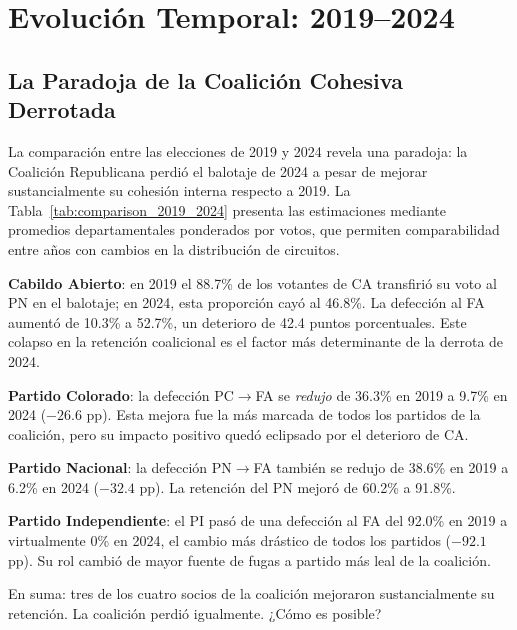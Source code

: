 
\section{Evolución Temporal: 2019--2024}
\label{sec:temporal}

\subsection{La Paradoja de la Coalición Cohesiva Derrotada}

La comparación entre las elecciones de 2019 y 2024 revela una paradoja: la Coalición Republicana perdió el balotaje de 2024 a pesar de mejorar sustancialmente su cohesión interna respecto a 2019. La Tabla~\ref{tab:comparison_2019_2024} presenta las estimaciones mediante promedios departamentales ponderados por votos, que permiten comparabilidad entre años con cambios en la distribución de circuitos.



\textbf{Cabildo Abierto}: en 2019 el 88.7\% de los votantes de CA transfirió su voto al PN en el balotaje; en 2024, esta proporción cayó al 46.8\%. La defección al FA aumentó de 10.3\% a 52.7\%, un deterioro de 42.4 puntos porcentuales. Este colapso en la retención coalicional es el factor más determinante de la derrota de 2024.

\textbf{Partido Colorado}: la defección PC$\to$FA se \textit{redujo} de 36.3\% en 2019 a 9.7\% en 2024 ($-26.6$ pp). Esta mejora fue la más marcada de todos los partidos de la coalición, pero su impacto positivo quedó eclipsado por el deterioro de CA.

\textbf{Partido Nacional}: la defección PN$\to$FA también se redujo de 38.6\% en 2019 a 6.2\% en 2024 ($-32.4$ pp). La retención del PN mejoró de 60.2\% a 91.8\%.

\textbf{Partido Independiente}: el PI pasó de una defección al FA del 92.0\% en 2019 a virtualmente 0\% en 2024, el cambio más drástico de todos los partidos ($-92.1$ pp). Su rol cambió de mayor fuente de fugas a partido más leal de la coalición.

En suma: tres de los cuatro socios de la coalición mejoraron sustancialmente su retención. La coalición perdió igualmente. ¿Cómo es posible?

